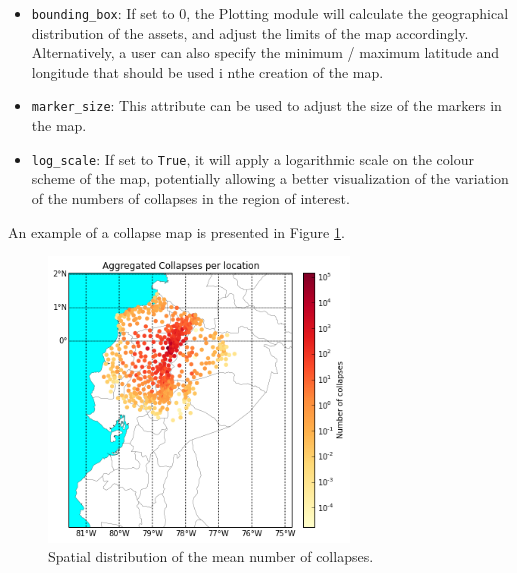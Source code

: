 \begin{itemize}
\item \verb=bounding_box=: If set to 0, the Plotting module will calculate the geographical distribution of the assets, and adjust the limits of the map accordingly. Alternatively, a user can also specify the minimum / maximum latitude and longitude that should be used i nthe creation of the map.
\item \verb=marker_size=: This attribute can be used to adjust the size of the markers in the map.
\item \verb=log_scale=: If set to \verb=True=, it will apply a logarithmic scale on the colour scheme of the map, potentially allowing a better visualization of the variation of the numbers of collapses in the region of interest.\\
\end{itemize}

An example of a collapse map is presented in Figure \ref{fig:collapse_map}.

\begin{figure}[htb]
  \centering
      \includegraphics[width=8cm]{figures/collapse_map.png}
  \caption{Spatial distribution of the mean number of collapses.}
  \label{fig:collapse_map}
\end{figure}
